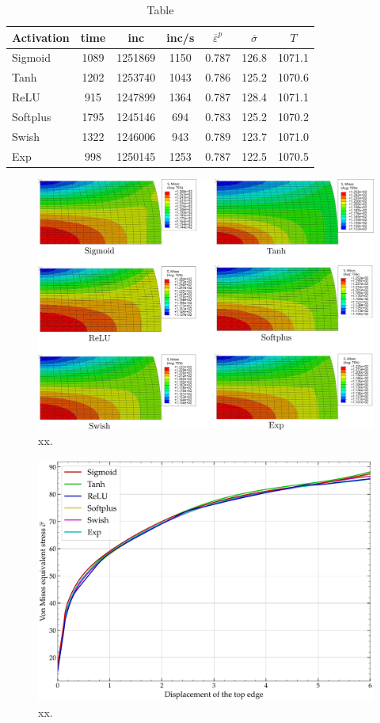 \documentclass[algorithms,article,submit,pdftex,moreauthors]{Definitions/mdpi}
\begin{document}
\begin{table}[H]
\caption{Table}
\begin{tabular}{lcccccc}
\toprule
Activation & time & inc & inc/s & $\overline{\varepsilon}^p$ & $\overline{\sigma}$ & $T$\\ \midrule
Sigmoid & 1089 & 1251869 & 1150 & 0.787 & 126.8 & 1071.1 \\
Tanh & 1202 & 1253740 & 1043 & 0.786 & 125.2 & 1070.6 \\ 
ReLU & 915 & 1247899 & 1364 & 0.787 & 128.4 & 1071.1 \\
Softplus & 1795 & 1245146 & 694 & 0.783 & 125.2 & 1070.2 \\
Swish & 1322 & 1246006 & 943 & 0.789 & 123.7 & 1071.0 \\
Exp & 998 & 1250145 & 1253 & 0.787 &122.5 &1070.5 \\
\bottomrule
\end{tabular}
\end{table}

\begin{figure}[h]
\centering
\includegraphics[width=0.8\columnwidth]{Figures/MisesHalf}
\caption{xx.}
\label{fig:Num-misesCP}
\end{figure}

\begin{figure}[h]
\centering
\includegraphics[width=0.8\columnwidth]{Figures/vonMises}
\caption{xx.}
\label{fig:Num-misesTH}
\end{figure}
\end{document}

